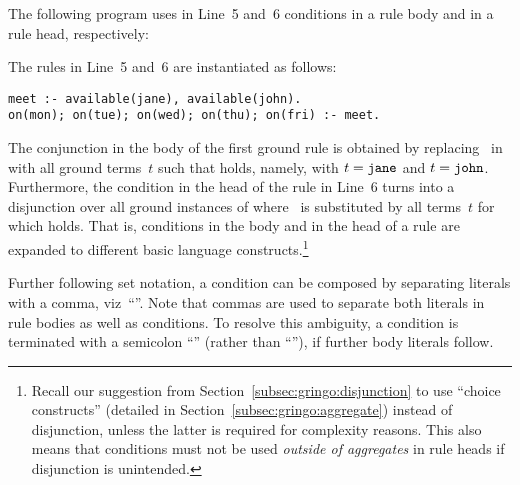 \begin{example}\label{ex:cond}
The following program uses in Line~5 and~6 conditions in a rule body and in a rule head, respectively:
%

%
The rules in Line~5 and~6 are instantiated as follows:%
\begin{lstlisting}[numbers=none]
meet :- available(jane), available(john).
on(mon); on(tue); on(wed); on(thu); on(fri) :- meet.
\end{lstlisting}
%
The conjunction in the body of the first ground rule is obtained by replacing~ in
 with all ground terms~$t$ such that
 holds, namely, with $t=\texttt{jane}$ and $t=\texttt{john}$.
Furthermore, the condition in the head of the rule in Line~6 turns into
a disjunction over all ground instances of
 where~ is substituted by all terms~$t$
for which  holds.
That is, conditions in the body and in the head of a rule
are expanded to different basic language constructs.\footnote{%
Recall our suggestion from Section~\ref{subsec:gringo:disjunction}
to use ``choice constructs'' (detailed in Section~\ref{subsec:gringo:aggregate})
instead of disjunction, unless the latter is required for complexity reasons.
This also means that conditions must
not be used \emph{outside of aggregates} in rule heads
if disjunction is unintended.}
\eexample
\end{example}

Further following set notation,
a condition can be composed by separating literals with a comma, viz~``\code{,}''.
Note that commas are used to separate both literals in rule bodies as well as conditions.
To resolve this ambiguity,
a condition is terminated with a semicolon ``\code{;}'' (rather than ``\code{,}''), if further body literals follow.

